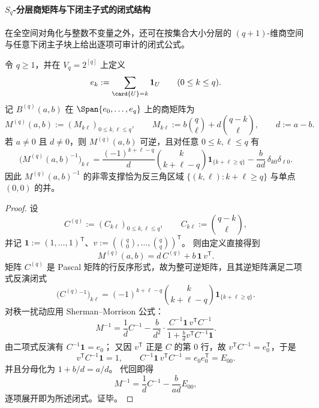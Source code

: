 \paragraph{\texorpdfstring{$S_q$}{Sq}-分层商矩阵与下闭主子式的闭式结构}
在全空间对角化与整数不变量之外，还可在按集合大小分层的 \((q+1)\)-维商空间与任意下闭主子块上给出逐项可审计的闭式公式。

\begin{theorem}\label{thm:xi-boolean-two-layer-symmetric-quotient-inverse}
令 \(q\ge 1\)，并在 \(V_q=2^{[q]}\) 上定义
\[
e_k:=\sum_{\card{U}=k}\mathbf 1_U\qquad(0\le k\le q).
\]
记 \(B^{(q)}(a,b)\) 在 \(\Span\{e_0,\dots,e_q\}\) 上的商矩阵为
\[
M^{(q)}(a,b):=(M_{k\ell})_{0\le k,\ell\le q},
\qquad
M_{k\ell}:=b\binom{q}{\ell}+d\binom{q-k}{\ell},
\qquad d:=a-b.
\]
若 \(a\neq 0\) 且 \(d\neq 0\)，则 \(M^{(q)}(a,b)\) 可逆，且对任意 \(0\le k,\ell\le q\) 有
\[
\bigl(M^{(q)}(a,b)^{-1}\bigr)_{k\ell}
=\frac{(-1)^{k+\ell-q}}{d}\binom{k}{k+\ell-q}\mathbf 1_{\{k+\ell\ge q\}}
-\frac{b}{ad}\,\delta_{k0}\delta_{\ell0}.
\]
因此 \(M^{(q)}(a,b)^{-1}\) 的非零支撑恰为反三角区域
\(\{(k,\ell):k+\ell\ge q\}\) 与单点 \((0,0)\) 的并。
\end{theorem}
\begin{proof}
设
\[
C^{(q)}:=(C_{k\ell})_{0\le k,\ell\le q},
\qquad
C_{k\ell}:=\binom{q-k}{\ell},
\]
并记 \(\mathbf 1:=(1,\dots,1)^{\mathsf T}\)、\(v:=(\binom{q}{0},\dots,\binom{q}{q})^{\mathsf T}\)。
则由定义直接得到
\[
M^{(q)}(a,b)=d\,C^{(q)}+b\,\mathbf 1\,v^{\mathsf T}.
\]
矩阵 \(C^{(q)}\) 是 Pascal 矩阵的行反序形式，故为整可逆矩阵，且其逆矩阵满足二项式反演闭式
\[
\bigl(C^{(q)}{}^{-1}\bigr)_{k\ell}
=(-1)^{k+\ell-q}\binom{k}{k+\ell-q}\mathbf 1_{\{k+\ell\ge q\}}.
\]
对秩一扰动应用 Sherman--Morrison 公式：
\[
M^{-1}
=\frac{1}{d}C^{-1}
-\frac{b}{d^2}\cdot
\frac{C^{-1}\mathbf 1\,v^{\mathsf T}C^{-1}}
{1+\frac{b}{d}v^{\mathsf T}C^{-1}\mathbf 1}.
\]
由二项式反演有 \(C^{-1}\mathbf 1=e_0\)；
又因 \(v^{\mathsf T}\) 正是 \(C\) 的第 \(0\) 行，故 \(v^{\mathsf T}C^{-1}=e_0^{\mathsf T}\)，于是
\[
v^{\mathsf T}C^{-1}\mathbf 1=1,\qquad
C^{-1}\mathbf 1\,v^{\mathsf T}C^{-1}=e_0e_0^{\mathsf T}=E_{00}.
\]
并且分母化为 \(1+b/d=a/d\)。
代回即得
\[
M^{-1}=\frac{1}{d}C^{-1}-\frac{b}{ad}E_{00},
\]
逐项展开即为所述闭式。证毕。
\end{proof}

